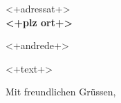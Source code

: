 \documentclass[12pt]{dinbrief}
\begin{document}
\begin{letter}{<+adressat+>\\[\medskipamount]
  \textbf{<+plz ort+>}}
  \subject{<+betreff+>}
  \date{<+datum+>}
  \nowindowrules
  \addresshigh
  \nowindowtics
  \opening{<+andrede+>}
  <+text+>
  \closing[Marius Kleiner]{Mit freundlichen Gr\"ussen,}
\end{letter}
\end{document}
